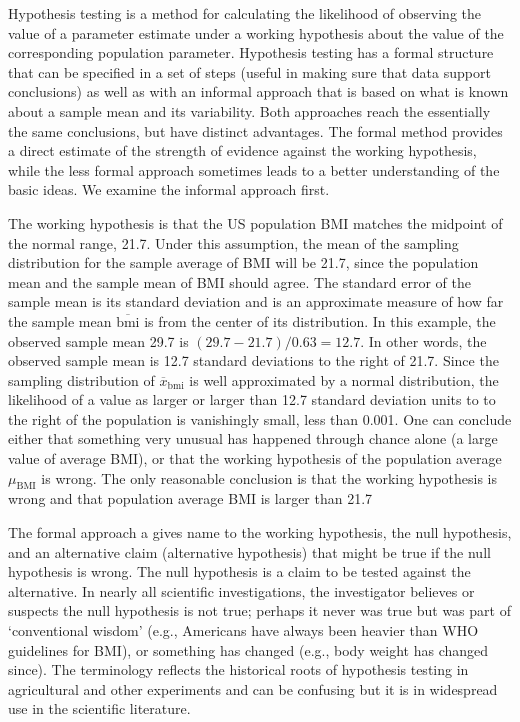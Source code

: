 \begin{spacing}{1.5}
Hypothesis testing is a method for calculating the likelihood of observing the value of a parameter estimate under a working hypothesis about the value of the corresponding population parameter.  Hypothesis testing has a formal structure that can be specified in a set of steps (useful in making sure that data support conclusions) as well as with an informal approach that is based on what is known about a sample mean and its variability.  Both approaches reach the essentially the same conclusions, but have distinct advantages.  The formal method provides a direct estimate of the strength of evidence against the working hypothesis, while the less formal approach sometimes leads to a better understanding of the basic ideas. We examine the informal approach first.

The working hypothesis is that the US population BMI matches the midpoint of the normal range, 21.7. Under this assumption, the mean of the sampling distribution for the sample average of BMI will be 21.7, since the population mean and the sample mean of BMI should agree.  The standard error of the sample mean is its standard deviation and is an approximate measure of how far the sample mean $\overline{\text{bmi}}$ is from the center of its distribution.  In this example, the observed sample mean 29.7 is $(29.7 - 21.7)/0.63 = 12.7$.  In other words, the observed sample mean is 12.7 standard deviations to the right of 21.7.  Since the sampling distribution of $\overline{x}_{\text{bmi}}$ is well approximated by a normal distribution, the likelihood of a value as larger or larger than 12.7 standard deviation units to to the right of the population is vanishingly small, less than 0.001.  One can conclude either that something very unusual has happened through chance alone (a large value of average BMI), or that the working hypothesis of the population average $\mu_{\text{BMI}}$ is wrong.  The only reasonable conclusion is that the working hypothesis is wrong and that population average BMI is larger than 21.7

The formal approach a gives name to the working hypothesis, the null hypothesis, and an alternative claim (alternative hypothesis) that might be true if the null hypothesis is wrong. The null hypothesis is a claim to be tested against the alternative.  In nearly all scientific investigations, the investigator believes or suspects the null hypothesis is not true; perhaps it never was true but was part of `conventional wisdom' (e.g., Americans have always been heavier than WHO guidelines for BMI), or something has changed (e.g., body weight has changed since).  The terminology reflects the historical roots of hypothesis testing in agricultural and other experiments and can be confusing but it is in widespread use in the scientific literature.


\end{spacing}
